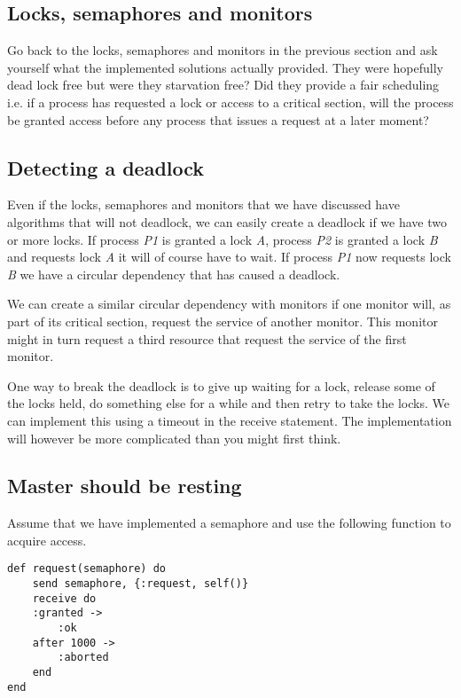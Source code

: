 \documentclass[a4paper,11pt]{article}
\begin{document}
\subsection{Locks, semaphores and monitors}

Go back to the locks, semaphores and monitors in the previous section
and ask yourself what the implemented solutions actually provided. They
were hopefully dead lock free but were they starvation free? Did they
provide a fair scheduling i.e. if a process has requested a lock or
access to a critical section, will the process be granted access
before any process that issues a request at a later moment?


\subsection{Detecting a deadlock}

Even if the locks, semaphores and monitors that we have discussed have
algorithms that will not deadlock, we can easily create a deadlock if
we have two or more locks. If process {\em P1} is granted a lock {\em
    A}, process {\em P2} is granted a lock {\em B} and requests lock
{\em A} it will of course have to wait. If process {\em P1} now
requests lock {\em B} we have a circular dependency that has caused a
deadlock.

We can create a similar circular dependency with monitors if one
monitor will, as part of its critical section, request the service of
another monitor. This monitor might in turn request a third resource
that request the service of the first monitor.

One way to break the deadlock is to give up waiting for a lock,
release some of the locks held, do something else for a while and then
retry to take the locks. We can implement this using a timeout in the
receive statement. The implementation will however be more complicated
than you might first think.


\subsection{Master should be resting}

Assume that we have implemented a semaphore and use the following
function to acquire access.

\begin{verbatim}
def request(semaphore) do
    send semaphore, {:request, self()}
    receive do
    :granted ->
        :ok
    after 1000 ->
        :aborted
    end
end
\end{verbatim}
\end{document}

